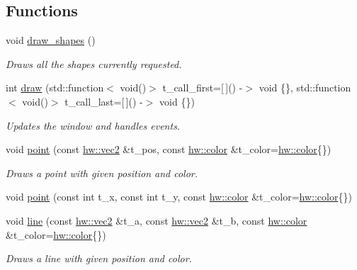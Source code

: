 \subsection*{Functions}
\begin{DoxyCompactItemize}
\item 
void \mbox{\hyperlink{namespacedummy__api_af7279753320ab1e1f990aeb1eae8207f}{draw\+\_\+shapes}} ()
\begin{DoxyCompactList}\small\item\em Draws all the shapes currently requested. \end{DoxyCompactList}\item 
int \mbox{\hyperlink{namespacedummy__api_a0f9b713b956e1acd503ea73b92666c6a}{draw}} (std\+::function$<$ void()$>$ t\+\_\+call\+\_\+first=\mbox{[}$\,$\mbox{]}() -\/$>$ void \{\}, std\+::function$<$ void()$>$ t\+\_\+call\+\_\+last=\mbox{[}$\,$\mbox{]}() -\/$>$ void \{\})
\begin{DoxyCompactList}\small\item\em Updates the window and handles events. \end{DoxyCompactList}\item 
\mbox{\label{namespacedummy__api_a249a7c0ef8dbebf1440e41f7a5c0298f}} 
void \mbox{\hyperlink{namespacedummy__api_a249a7c0ef8dbebf1440e41f7a5c0298f}{point}} (const \mbox{\hyperlink{structhw_1_1vec2}{hw\+::vec2}} \&t\+\_\+pos, const \mbox{\hyperlink{structhw_1_1color}{hw\+::color}} \&t\+\_\+color=\mbox{\hyperlink{structhw_1_1color}{hw\+::color}}\{\})
\begin{DoxyCompactList}\small\item\em Draws a point with given position and color. \end{DoxyCompactList}\item 
void \mbox{\hyperlink{namespacedummy__api_a4efd30052d197d72b64bd67f13322e5a}{point}} (const int t\+\_\+x, const int t\+\_\+y, const \mbox{\hyperlink{structhw_1_1color}{hw\+::color}} \&t\+\_\+color=\mbox{\hyperlink{structhw_1_1color}{hw\+::color}}\{\})
\item 
void \mbox{\hyperlink{namespacedummy__api_a7bac2a56021c552911f6dc5ae4c8f5ad}{line}} (const \mbox{\hyperlink{structhw_1_1vec2}{hw\+::vec2}} \&t\+\_\+a, const \mbox{\hyperlink{structhw_1_1vec2}{hw\+::vec2}} \&t\+\_\+b, const \mbox{\hyperlink{structhw_1_1color}{hw\+::color}} \&t\+\_\+color=\mbox{\hyperlink{structhw_1_1color}{hw\+::color}}\{\})
\begin{DoxyCompactList}\small\item\em Draws a line with given position and color. \end{DoxyCompactList}\item 

\end{DoxyCompactItemize}
